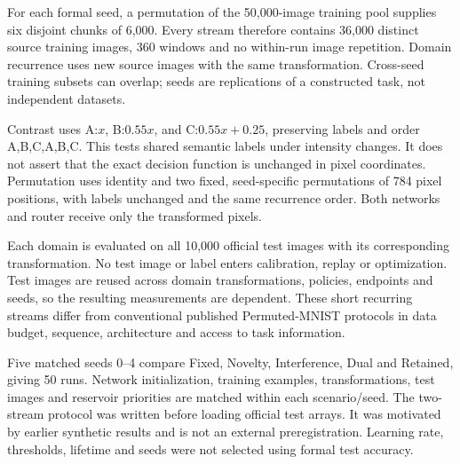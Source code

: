 For each formal seed, a permutation of the 50,000-image training pool supplies six disjoint chunks of 6,000. Every stream therefore contains 36,000 distinct source training images, 360 windows and no within-run image repetition. Domain recurrence uses new source images with the same transformation. Cross-seed training subsets can overlap; seeds are replications of a constructed task, not independent datasets.

Contrast uses A:\(x\), B:\(0.55x\), and C:\(0.55x+0.25\), preserving labels and order A,B,C,A,B,C. This tests shared semantic labels under intensity changes. It does not assert that the exact decision function is unchanged in pixel coordinates. Permutation uses identity and two fixed, seed-specific permutations of 784 pixel positions, with labels unchanged and the same recurrence order. Both networks and router receive only the transformed pixels.

Each domain is evaluated on all 10,000 official test images with its corresponding transformation. No test image or label enters calibration, replay or optimization. Test images are reused across domain transformations, policies, endpoints and seeds, so the resulting measurements are dependent. These short recurring streams differ from conventional published Permuted-MNIST protocols in data budget, sequence, architecture and access to task information.

Five matched seeds 0--4 compare Fixed, Novelty, Interference, Dual and Retained, giving 50 runs. Network initialization, training examples, transformations, test images and reservoir priorities are matched within each scenario/seed. The two-stream protocol was written before loading official test arrays. It was motivated by earlier synthetic results and is not an external preregistration. Learning rate, thresholds, lifetime and seeds were not selected using formal test accuracy.

